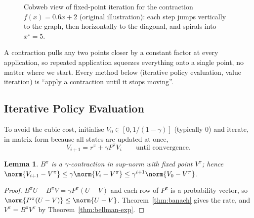 \documentclass[11pt,a4paper]{article}
\theoremstyle{plain}
\newtheorem{lemma}[theorem]{Lemma}
\theoremstyle{definition}
\theoremstyle{remark}
\begin{document}
\begin{figure}[h]
\centering
{}
\caption{Cobweb view of fixed-point iteration for the contraction $f(x)=0.6x+2$ (original illustration): each step jumps vertically to the graph, then horizontally to the diagonal, and spirals into $x^\star=5$.}
\end{figure}

\begin{intuition}
A contraction pulls any two points closer by a constant factor at every application, so repeated application squeezes everything onto a single point, no matter where we start. Every method below (iterative policy evaluation, value iteration) is ``apply a contraction until it stops moving''.
\end{intuition}

\subsection{Iterative Policy Evaluation}
To avoid the cubic cost, initialise $V_0\in[0,1/(1-\gamma)]$ (typically $0$) and iterate, in matrix form because all states are updated at once,
\[
V_{i+1}=r^\pi+\gamma P^\pi V_i\qquad\text{until convergence.}
\]
\begin{lemma}\label{lem:Bpi}
$B^\pi$ is a $\gamma$-contraction in sup-norm with fixed point $V^\pi$; hence $\norm{V_{i+1}-V^\pi}\le\gamma\norm{V_i-V^\pi}\le\gamma^{i+1}\norm{V_0-V^\pi}$.
\end{lemma}
\begin{proof}
$B^\pi U-B^\pi V=\gamma P^\pi(U-V)$ and each row of $P^\pi$ is a probability vector, so $\norm{P^\pi(U-V)}\le\norm{U-V}$. Theorem~\ref{thm:banach} gives the rate, and $V^\pi=B^\pi V^\pi$ by Theorem~\ref{thm:bellman-exp}.
\end{proof}
\end{document}
